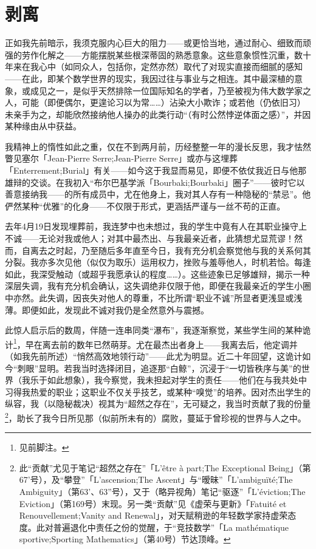 \section{剥离}

正如我先前暗示，我须克服内心巨大的阻力——或更恰当地，通过耐心、细致而顽强的劳作化解之——方能摆脱某些根深蒂固的熟悉意象。这些意象惯性沉重，数十年来在我心中（如同众人，包括你，定然亦然）取代了对现实直接而细腻的感知——在此，即某个数学世界的现实，我因过往与事业与之相连。其中最深植的意象，或成见之一，是似乎天然排除一位国际知名的学者，乃至被视为伟大数学家之人，可能（即便偶尔，更遑论习以为常……）沾染大小欺诈；或若他（仍依旧习）未亲手为之，却能欣然接纳他人操办的此类行动“（有时公然悖逆体面之感）”，并因某种缘由从中获益。

我精神上的惰性如此之重，仅在不到两月前，历经整整一年的漫长反思，我才怯然瞥见塞尔「Jean-Pierre Serre;Jean-Pierre Serre」或亦与这埋葬「Enterrement;Burial」有关——如今这于我显而易见，即便不依仗我近日与他那雄辩的交谈。在我初入“布尔巴基学派「Bourbaki;Bourbaki」圈子”——彼时它以善意接纳我——的所有成员中，尤在他身上，我对其人存有一种隐秘的“禁忌”。他俨然某种“优雅”的化身——不仅限于形式，更涵括严谨与一丝不苟的正直。

去年4月19日发现埋葬前，我连梦中也未想过，我的学生中竟有人在其职业操守上不诚——无论对我或他人；对其中最杰出、与我最亲近者，此猜想尤显荒谬！然而，自离去之时起，乃至随后多年直至今日，我有充分机会察觉他与我的关系何其分裂。我亦多次见他（似仅为取乐）运用权力，挫败与羞辱他人，时机若恰。每逢如此，我深受触动（或超乎我愿承认的程度……）。这些迹象已足够雄辩，揭示一种深层失调，我有充分机会确认，这失调绝非仅限于他，即便在我最亲近的学生小圈中亦然。此失调，因丧失对他人的尊重，不比所谓“职业不诚”所显者更浅显或浅薄。即便如此，发现此不诚对我仍是全然意外与震撼。

此惊人启示后的数周，伴随一连串同类“瀑布”，我逐渐察觉，某些学生间的某种诡计\footnote{见前脚注。}，早在离去前的数年已然萌芽。尤在最杰出者身上——我离去后，他定调并（如我先前所述）“悄然高效地领行动”——此尤为明显。近二十年回望，这诡计如今“刺眼”显明。若我当时选择闭目，追逐那“白鲸”，沉浸于“一切皆秩序与美”的世界（我乐于如此想象），我今察觉，我未担起对学生的责任——他们在与我共处中习得我热爱的职业；这职业不仅关乎技艺，或某种“嗅觉”的培养。因对杰出学生的纵容，我（以隐秘裁决）视其为“超然之存在”，无可疑之，我当时贡献了我的份量\footnote{此“贡献”尤见于笔记“超然之存在”「L'être à part;The Exceptional Being」（第67'号），及“攀登”「L'ascension;The Ascent」与“暧昧”「L'ambiguïté;The Ambiguity」（第63'、63''号），又于（略异视角）笔记“驱逐”「L'éviction;The Eviction」（第169号）末现。另一类“贡献”见《虚荣与更新》「Fatuité et Renouvellement;Vanity and Renewal」，对天赋稍逊的年轻数学家持虚荣态度。此对普遍退化中责任之份的觉醒，于“竞技数学”「La mathématique sportive;Sporting Mathematics」（第40号）节达顶峰。}，助长了我今日所见那（似前所未有的）腐败，蔓延于曾珍视的世界与人之中。

